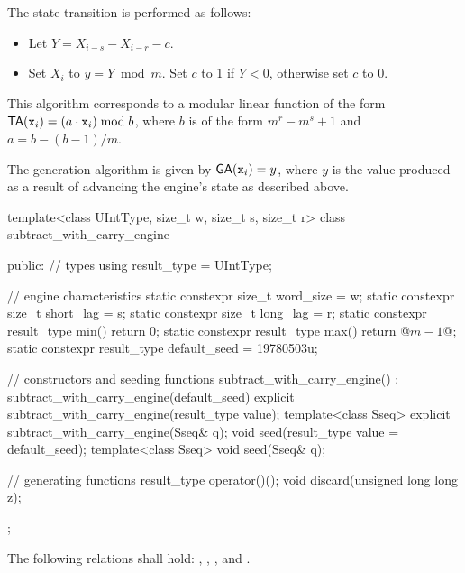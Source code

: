 \pnum
The state transition%
%
is performed as follows:
\begin{itemize}
 \item
   Let $Y = X_{i-s} - X_{i-r} - c$.
 \item
   Set $X_i$ to $y = Y \bmod m$.
   Set $c$ to 1 if $Y < 0$,
   otherwise set $c$ to 0.
\end{itemize}
\begin{note}
 This algorithm corresponds
 to a modular linear function
 of the form
 $\mathsf{TA}(\texttt{x}_{i}) = (a \cdot \texttt{x}_{i}) \bmod b$,
 where $b$ is of the form
 $m^r - m^s + 1$
 and $a = b - (b - 1) / m$.
\end{note}

\pnum
The generation algorithm%
%
is given by $\mathsf{GA}(\texttt{x}_{i}) = y$,
where $y$ is the value produced as a result
of advancing the engine's state as described above.

%
\begin{codeblock}
template<class UIntType, size_t w, size_t s, size_t r>
  class subtract_with_carry_engine {
  public:
    // types
    using result_type = UIntType;

    // engine characteristics
    static constexpr size_t word_size = w;
    static constexpr size_t short_lag = s;
    static constexpr size_t long_lag = r;
    static constexpr result_type min() { return 0; }
    static constexpr result_type max() { return @$m - 1$@; }
    static constexpr result_type default_seed = 19780503u;

    // constructors and seeding functions
    subtract_with_carry_engine() : subtract_with_carry_engine(default_seed) {}
    explicit subtract_with_carry_engine(result_type value);
    template<class Sseq> explicit subtract_with_carry_engine(Sseq& q);
    void seed(result_type value = default_seed);
    template<class Sseq> void seed(Sseq& q);

    // generating functions
    result_type operator()();
    void discard(unsigned long long z);
  };
\end{codeblock}

\pnum
The following relations shall hold:
  ,
  ,
  ,
and
  .

